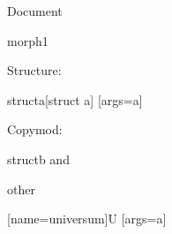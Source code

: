 \documentclass[debug=all]{stex}
\begin{document}
\noindent Document \printdocument

\begin{smodule}{morph1}

  Structure:
  \begin{mathstructure}{structa}[struct a]
    [args=a]{}
  \end{mathstructure}

  Copymod:
  \begin{mathstructure}{structb}
     and 
  \end{mathstructure}

\end{smodule}

\begin{smodule}{other}

  [name=universum]{\mathcal U}
  [args=a]{}

\end{smodule}
\end{document}
